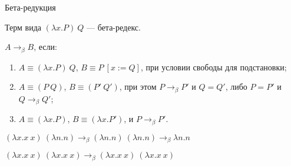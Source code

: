 \documentclass[aspectratio=169]{beamer}
\begin{document}
\begin{frame}{Бета-редукция}

\begin{dfn} Терм вида $(\lambda x.P)\ Q$ --- бета-редекс.\end{dfn}
\begin{dfn} $A \rightarrow_\beta B$, если:
\begin{enumerate}
\item $A \equiv (\lambda x.P)\ Q$, $B \equiv P\ [x := Q]$, при условии свободы для подстановки;
\item $A \equiv (P\ Q)$, $B \equiv (P'\ Q')$, при этом $P \rightarrow_\beta P'$ и $Q = Q'$, либо $P = P'$ и $Q \rightarrow_\beta Q'$;
\item $A \equiv (\lambda x.P)$, $B \equiv (\lambda x.P')$, и $P \rightarrow_\beta P'$.
\end{enumerate}
\end{dfn}%

\begin{exm}
$(\lambda x.x\ x)\ (\lambda n.n) \rightarrow_\beta (\lambda n.n)\ (\lambda n.n) \rightarrow_\beta \lambda n.n$
\end{exm}
\begin{exm}
$(\lambda x.x\ x)\ (\lambda x.x\ x) \rightarrow_\beta (\lambda x.x\ x)\ (\lambda x.x\ x)$
\end{exm}
\end{frame}

\end{document}
